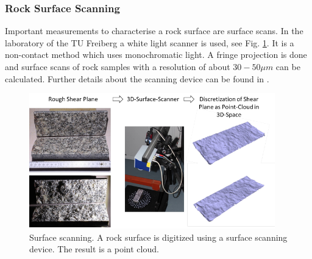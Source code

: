\subsubsection{Rock Surface Scanning}
Important measurements to characterise a rock surface are surface scans. In the laboratory of the TU Freiberg a white light scanner is used, see Fig. \ref{TUBAFScanner}. It is a non-contact method which uses monochromatic light. A fringe projection is done and surface scans of rock samples with a resolution of about $30-50 \unit{\mu m}$ can be calculated. Further details about the scanning device can be found in \cite{TUBAFScanningDevice}. 

\begin{figure}[!ht]
\centering
\includegraphics[width=0.95\textwidth]{figures/geomint-wp3-12a}
\caption{Surface scanning. A rock surface is digitized using a surface scanning device. The result is a point cloud.}\label{TUBAFScanner}
\end{figure}